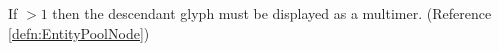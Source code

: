 If  $>1$ then the descendant glyph must be displayed
  as a multimer.
(Reference \ref{defn:EntityPoolNode})
